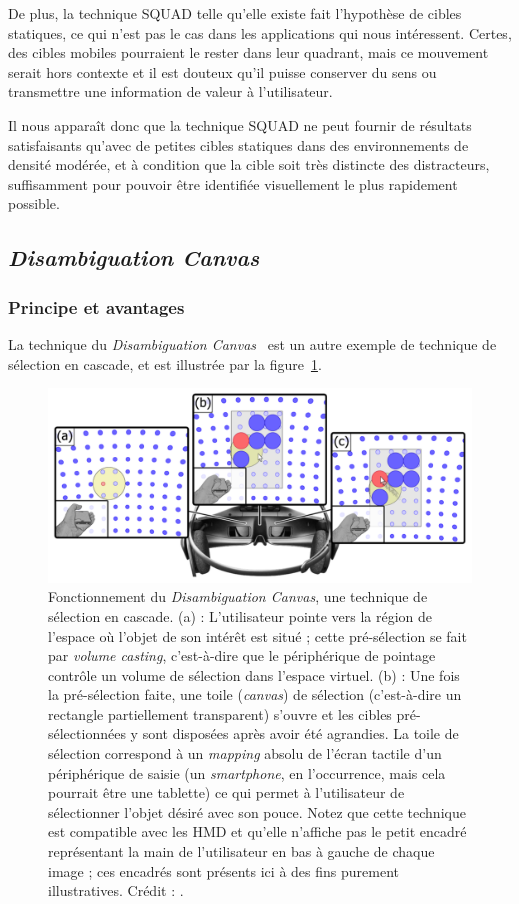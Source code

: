 	De plus, la technique SQUAD telle qu'elle existe fait l'hypothèse de cibles statiques, ce qui n'est pas le cas dans les applications qui nous intéressent. Certes, des cibles mobiles pourraient le rester dans leur quadrant, mais ce mouvement serait hors contexte et il est douteux qu'il puisse conserver du sens ou transmettre une information de valeur à l'utilisateur.
	
	Il nous apparaît donc que la technique SQUAD ne peut fournir de résultats satisfaisants qu'avec de petites cibles statiques dans des environnements de densité modérée, et à condition que la cible soit très distincte des distracteurs, suffisamment pour pouvoir être identifiée visuellement le plus rapidement possible.
	
	\subsection{\emph{Disambiguation Canvas}}
	\subsubsection{Principe et avantages}
	La technique du \emph{Disambiguation Canvas}~\cite{debarba2013disambiguation} est un autre exemple de technique de sélection en cascade, et est illustrée par la figure~\ref{fig:dCanvas}.
		 
	\begin{figure}[H]
		\centering
		\includegraphics[width=\textwidth]{figures/ch2/dCanvas}
		\caption[\emph{Disambiguation Canvas}]{Fonctionnement du \emph{Disambiguation Canvas}, une technique de sélection en cascade. (a) : L'utilisateur pointe vers la région de l'espace où l'objet de son intérêt est situé ; cette pré-sélection se fait par \emph{volume casting}, c'est-à-dire que le périphérique de pointage contrôle un volume de sélection dans l'espace virtuel. (b) : Une fois la pré-sélection faite, une \og toile \fg{} (\emph{canvas}) de sélection (c'est-à-dire un rectangle partiellement transparent) s'ouvre et les cibles pré-sélectionnées y sont disposées après avoir été agrandies. La toile de sélection correspond à un \emph{mapping} absolu de l'écran tactile d'un périphérique de saisie (un \emph{smartphone}, en l'occurrence, mais cela pourrait être une tablette) ce qui permet à l'utilisateur de sélectionner l'objet désiré avec son pouce. Notez que cette technique est compatible avec les HMD et qu'elle n'affiche pas le petit encadré représentant la main de l'utilisateur en bas à gauche de chaque image ; ces encadrés sont présents ici à des fins purement illustratives. Crédit : \cite{debarba2013disambiguation}.}
		\label{fig:dCanvas}
	\end{figure}
	

